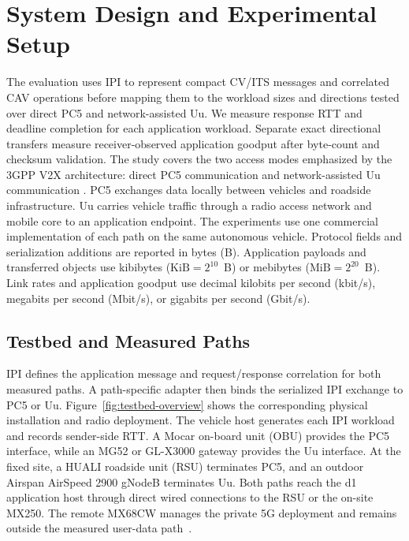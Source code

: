 \section{System Design and Experimental Setup}
\label{sec:system-design}
\label{sec:setup}

The evaluation uses IPI to represent compact CV/ITS messages and correlated CAV
operations before mapping them to the workload sizes and directions tested over
direct PC5 and network-assisted Uu. We measure response RTT and deadline
completion for each application workload. Separate exact directional transfers
measure receiver-observed application goodput after byte-count and checksum
validation. The study covers the two access modes emphasized by the 3GPP V2X
architecture: direct PC5 communication and network-assisted Uu communication
\cite{etsi123287r18}. PC5 exchanges data locally between vehicles and roadside
infrastructure. Uu carries vehicle traffic through a radio access network and
mobile core to an application endpoint. The experiments use one
commercial implementation of each path on the same autonomous vehicle.
Protocol fields and serialization additions are reported in bytes (B).
Application payloads and transferred objects use kibibytes
($\mathrm{KiB}=2^{10}$~B) or mebibytes ($\mathrm{MiB}=2^{20}$~B). Link rates
and application goodput use decimal kilobits per second (kbit/s), megabits per
second (Mbit/s), or gigabits per second (Gbit/s).

\subsection{Testbed and Measured Paths}

IPI defines the application message and request/response correlation for both
measured paths. A path-specific adapter then binds the serialized IPI exchange
to PC5 or Uu. Figure~\ref{fig:testbed-overview} shows the corresponding physical
installation and radio deployment. The vehicle host generates each IPI
workload and records sender-side RTT. A Mocar on-board unit
(OBU) provides the PC5 interface, while an MG52 or GL-X3000 gateway provides
the Uu interface. At the fixed site, a HUALI roadside unit (RSU) terminates
PC5, and an outdoor Airspan AirSpeed 2900 gNodeB terminates Uu. Both paths
reach the d1 application host through direct wired connections to the RSU or
the on-site MX250. The remote MX68CW manages the private 5G deployment and
remains outside the measured user-data
path~\cite{cisco2025private5g,cisco2026mx250,cisco2026mx68}.

